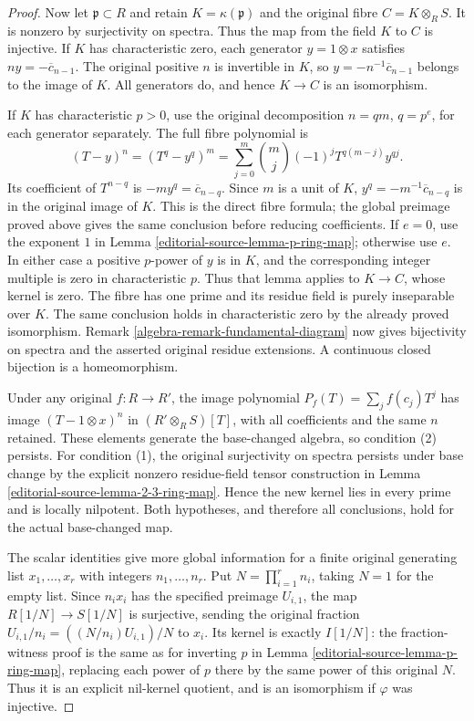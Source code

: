 \begin{proof}
Now let $\mathfrak p\subset R$
and retain $K=\kappa(\mathfrak p)$
and the original fibre
$C=K\otimes_R S$. It is nonzero
by surjectivity on spectra. Thus
the map from the field $K$ to $C$
is injective. If $K$ has
characteristic zero, each generator
$y=1\otimes x$ satisfies
$n y=-\overline c_{n-1}$.
The original positive $n$ is
invertible in $K$, so
$y=-n^{-1}\overline c_{n-1}$
belongs to the image of $K$.
All generators do, and hence
$K\to C$ is an isomorphism.

If $K$ has characteristic $p>0$,
use the original decomposition
$n=q m$, $q=p^e$, for each
generator separately. The full
fibre polynomial is
$$
(T-y)^n=(T^q-y^q)^m
=\sum_{j=0}^m\binom mj(-1)^j
T^{q(m-j)}y^{qj}.
$$
Its coefficient of $T^{n-q}$
is $-m y^q=\overline c_{n-q}$.
Since $m$ is a unit of $K$,
$y^q=-m^{-1}\overline c_{n-q}$
is in the original image of $K$.
This is the direct fibre formula;
the global preimage proved above
gives the same conclusion before
reducing coefficients.
If $e=0$, use the exponent $1$
in Lemma \ref{editorial-source-lemma-p-ring-map};
otherwise use $e$. In either
case a positive $p$-power of $y$
is in $K$, and the corresponding
integer multiple is zero in
characteristic $p$. Thus that
lemma applies to $K\to C$, whose
kernel is zero. The fibre has
one prime and its residue field
is purely inseparable over $K$.
The same conclusion holds in
characteristic zero by the
already proved isomorphism.
Remark \ref{algebra-remark-fundamental-diagram}
now gives bijectivity on spectra
and the asserted original residue
extensions. A continuous closed
bijection is a homeomorphism.

Under any original $f:R\to R'$,
the image polynomial
$P_f(T)=\sum_j f(c_j)T^j$ has
image $(T-1\otimes x)^n$ in
$(R'\otimes_R S)[T]$, with all
coefficients and the same $n$
retained. These elements generate
the base-changed algebra, so
condition (2) persists. For
condition (1), the original
surjectivity on spectra persists
under base change by the explicit
nonzero residue-field tensor
construction in Lemma
\ref{editorial-source-lemma-2-3-ring-map}. Hence
the new kernel lies in every
prime and is locally nilpotent.
Both hypotheses, and therefore
all conclusions, hold for the
actual base-changed map.

The scalar identities give more
global information for a finite
original generating list
$x_1,\ldots,x_r$ with integers
$n_1,\ldots,n_r$. Put
$N=\prod_{i=1}^r n_i$, taking
$N=1$ for the empty list.
Since $n_i x_i$ has the
specified preimage $U_{i,1}$,
the map $R[1/N]\to S[1/N]$
is surjective, sending the
original fraction
$U_{i,1}/n_i=((N/n_i)U_{i,1})/N$
to $x_i$. Its kernel is exactly
$I[1/N]$: the fraction-witness
proof is the same as for
inverting $p$ in Lemma
\ref{editorial-source-lemma-p-ring-map}, replacing
each power of $p$ there by the
same power of this original $N$.
Thus it is an explicit nil-kernel
quotient, and is an isomorphism
if $\varphi$ was injective.


\end{proof}
